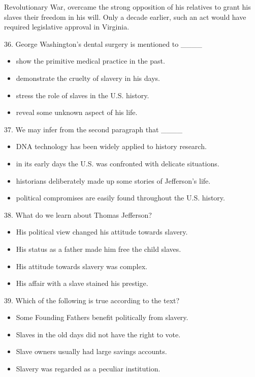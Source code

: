 \documentclass[UTF8,11pt]{ctexart}
\begin{document}
Revolutionary War, overcame the strong opposition of his relatives to grant his slaves their freedom in his will. Only a decade earlier, such an act would have required legislative approval in Virginia.


36. George Washington’s dental surgery is mentioned to \_\_\_\_


\begin{itemize}[leftmargin=2em,itemsep=.2em,topsep=.4em]\item[A.] show the primitive medical practice in the past.
\item[B.] demonstrate the cruelty of slavery in his days.
\item[C.] stress the role of slaves in the U.S. history.
\item[D.] reveal some unknown aspect of his life.
\end{itemize}

37. We may infer from the second paragraph that \_\_\_\_


\begin{itemize}[leftmargin=2em,itemsep=.2em,topsep=.4em]\item[A.] DNA technology has been widely applied to history research.
\item[B.] in its early days the U.S. was confronted with delicate situations.
\item[C.] historians deliberately made up some stories of Jefferson’s life.
\item[D.] political compromises are easily found throughout the U.S. history.
\end{itemize}

38. What do we learn about Thomas Jefferson?


\begin{itemize}[leftmargin=2em,itemsep=.2em,topsep=.4em]\item[A.] His political view changed his attitude towards slavery.
\item[B.] His status as a father made him free the child slaves.
\item[C.] His attitude towards slavery was complex.
\item[D.] His affair with a slave stained his prestige.
\end{itemize}

39. Which of the following is true according to the text?


\begin{itemize}[leftmargin=2em,itemsep=.2em,topsep=.4em]\item[A.] Some Founding Fathers benefit politically from slavery.
\item[B.] Slaves in the old days did not have the right to vote.
\item[C.] Slave owners usually had large savings accounts.
\item[D.] Slavery was regarded as a peculiar institution.
\end{itemize}
\end{document}
